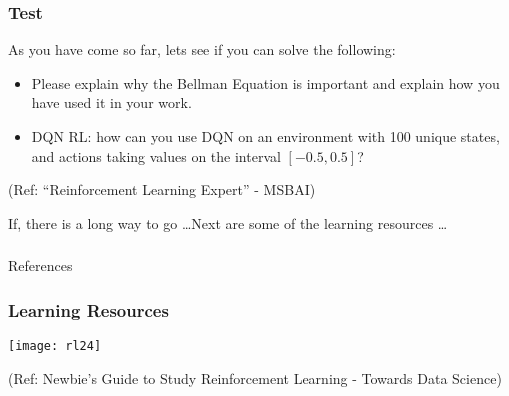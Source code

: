 \begin{frame}\frametitle{Test}
As you have come so far, lets see if you can solve the following:

\begin{itemize}
\item Please explain why the Bellman Equation is important and explain how you have used it in your work.
\item DQN RL: how can you use DQN on an environment with 100 unique states, and actions taking values on the interval $[-0.5, 0.5]$?
\end{itemize}

{\tiny (Ref: ``Reinforcement Learning Expert'' - MSBAI)}

If, there is a long way to go \ldots  Next are some of the learning resources \ldots
\end{frame}


\begin{frame}[fragile]\frametitle{}
\begin{center}
{\Large References}
\end{center}
\end{frame}

\begin{frame}[fragile]\frametitle{Learning Resources}
\begin{center}
\texttt{[image: rl24]}
\end{center}
{\tiny (Ref: Newbie’s Guide to Study Reinforcement Learning - Towards Data Science)}
\end{frame}

